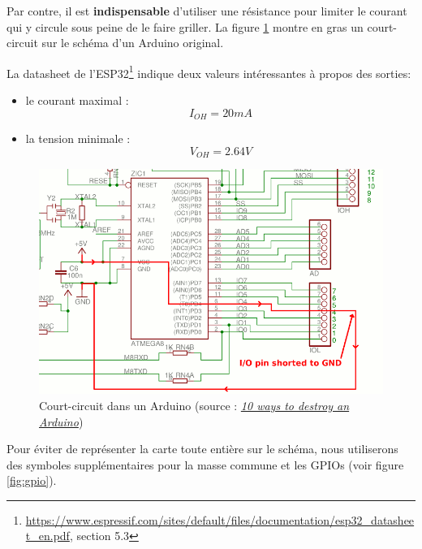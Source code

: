 \documentclass[11pt,a4paper,oneside,twocolumn]{article}
\begin{document}
Par contre, il est \textbf{indispensable} d'utiliser une résistance pour limiter
le courant qui y circule sous peine de le faire griller.
La figure \ref{fig:arduinoshort} montre en gras un court-circuit sur le schéma
d'un Arduino original.

La datasheet de
l'ESP32\footnote{\url{https://www.espressif.com/sites/default/files/documentation/esp32\_datasheet\_en.pdf},
section 5.3} indique deux valeurs intéressantes à propos des sorties:
\begin{itemize}
\item le courant maximal :
	\begin{equation}
		I_{OH}=20\si{mA}
	\end{equation}
\item la tension minimale :
	\begin{equation}
		V_{OH}=2.64\si{V}
	\end{equation}
\end{itemize}

\begin{figure}[ht]
	\centering
	\includegraphics[width=\linewidth]{arduinoshort.png}
	\caption{Court-circuit dans un Arduino (source :
	\href{https://www.rugged-circuits.com/10-ways-to-destroy-an-arduino}
	{\emph{10 ways to destroy an Arduino}})}
	\label{fig:arduinoshort}
\end{figure}

\newcommand\esymbol[1]{\begin{circuitikz}
\draw (0,0) to [#1] (1,0); \end{circuitikz}}

Pour éviter de représenter la carte toute entière sur le schéma, nous
utiliserons des symboles supplémentaires pour
la masse commune et
les GPIOs (voir figure \ref{fig:gpio}).
\end{document}
